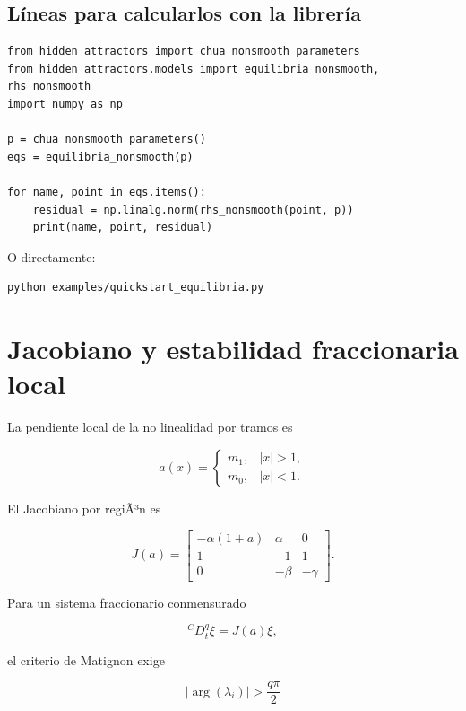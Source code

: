 \documentclass[11pt]{article}
\begin{document}
\subsection{Líneas para calcularlos con la librería}

\begin{lstlisting}
from hidden_attractors import chua_nonsmooth_parameters
from hidden_attractors.models import equilibria_nonsmooth, rhs_nonsmooth
import numpy as np

p = chua_nonsmooth_parameters()
eqs = equilibria_nonsmooth(p)

for name, point in eqs.items():
    residual = np.linalg.norm(rhs_nonsmooth(point, p))
    print(name, point, residual)
\end{lstlisting}

O directamente:

\begin{lstlisting}
python examples/quickstart_equilibria.py
\end{lstlisting}

\section{Jacobiano y estabilidad fraccionaria local}

La pendiente local de la no linealidad por tramos es

\begin{equation}
a(x)=
\begin{cases}
m_1,& |x|>1,\\
m_0,& |x|<1.
\end{cases}
\end{equation}

El Jacobiano por regiÃ³n es

\begin{equation}
J(a)=
\begin{bmatrix}
-\alpha(1+a)&\alpha&0\\
1&-1&1\\
0&-\beta&-\gamma
\end{bmatrix}.
\end{equation}

Para un sistema fraccionario conmensurado

\begin{equation}
{}^C D_t^q \xi=J(a)\xi,
\end{equation}

el criterio de Matignon exige

\begin{equation}
|\arg(\lambda_i)|>\frac{q\pi}{2}
\end{equation}
\end{document}
